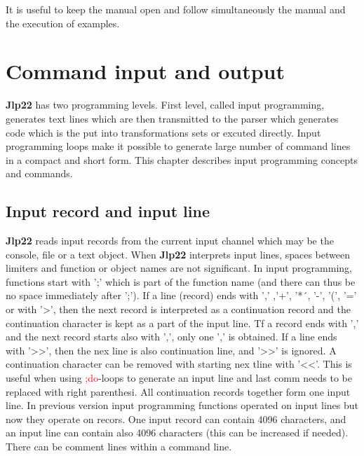 It is useful to keep the manual open and follow simultaneously the manual and the execution of examples. 
 
 
 
\section{Command input and output} 
\label{cominout} 
\textbf{Jlp22} has two programming levels. First level, called input programming, generates text lines which are then 
transmitted to the parser which generates code which is the put into transformations sets or 
excuted directly. Input programming loops make it possible to generate large number of command lines 
in a compact and short form. This chapter describes input programming concepts and commands. 
\subsection{Input record and input line} 
\label{inpuline} 
\textbf{Jlp22} reads input records from the current input channel which may be the console, file or a text object. 
When \textbf{Jlp22} interprets input lines, spaces between limiters and function or object names are not 
significant. In input programming, functions start with ';' which is part of the function name (and 
there can thus be no space immediately after ';'). If a line (record) ends with ',' ,'+', '*´, '-', 
'(', '=' or with '>', then the next record is interpreted as a continuation record and 
the continuation character is kept as a part of the input 
line. Tf a record ends with ',' and the next record starts also with ',', only one ',' is obtained. If a line ends with '>{}>', then 
the nex line is also continuation line, and  '>{}>' is ignored. 
A continuation character can be removed with starting nex tline with 
'<<'. This is useful when using \textcolor{Red}{;do}-loops to generate 
an input line and last comm needs to be replaced with right parenthesi. 
All continuation 
records together form one input line. In previous version input programming functions operated on input lines 
but now they operate on recors. One input record can contain 4096 characters, and an input line can contain also 4096 characters 
(this can be increased if needed). 
There can be comment lines within a command line. 
 
